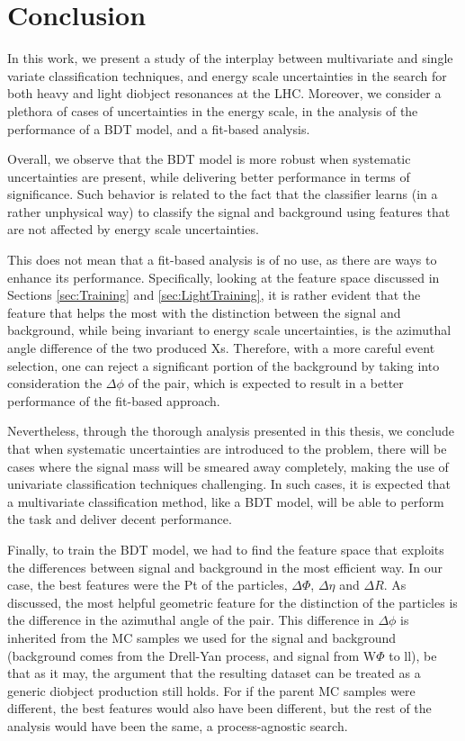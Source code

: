 \chapter{Conclusion}
\label{sec:org11ceed0}
In this work, we present a study of the interplay between multivariate and single variate classification techniques, and energy scale uncertainties in the search for both heavy and light diobject resonances at the LHC. Moreover, we consider a plethora of cases of uncertainties in the energy scale, in the analysis of the performance of a BDT model, and a fit-based analysis.

Overall, we observe that the BDT model is more robust when systematic uncertainties are present, while delivering better performance in terms of significance. Such behavior is related to the fact that the classifier learns (in a rather unphysical way) to classify the signal and background using features that are not affected by energy scale uncertainties.

This does not mean that a fit-based analysis is of no use, as there are ways to enhance its performance. Specifically, looking at the feature space discussed in Sections \ref{sec:Training} and \ref{sec:LightTraining}, it is rather evident that the feature that helps the most with the distinction between the signal and background, while being invariant to energy scale uncertainties, is the azimuthal angle difference of the two produced Xs. Therefore, with a more careful event selection, one can reject a significant portion of the background by taking into consideration the \(\Delta \phi\) of the pair, which is expected to result in a better performance of the fit-based approach.

Nevertheless, through the thorough analysis presented in this thesis, we conclude that when systematic uncertainties are introduced to the problem, there will be cases where the signal mass will be smeared away completely, making the use of univariate classification techniques challenging. In such cases, it is expected that a multivariate classification method, like a BDT model, will be able to perform the task and deliver decent performance.

Finally, to train the BDT model, we had to find the feature space that exploits the differences between signal and background in the most efficient way. In our case, the best features were the Pt of the particles, \(\Delta\Phi\), \(\Delta\eta\) and \(\Delta R\). As discussed, the most helpful geometric feature for the distinction of the particles is the difference in the azimuthal angle of the pair. This difference in \(\Delta \phi\) is inherited from the MC samples we used for the signal and background (background comes from the Drell-Yan process, and signal from W\(\Phi\) to ll), be that as it may, the argument that the resulting dataset can be treated as a generic diobject production still holds. For if the parent MC samples were different, the best features would also have been different, but the rest of the analysis would have been the same, a process-agnostic search.
